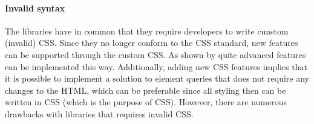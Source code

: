 \documentclass[a4paper,11pt]{kth-mag}
\begin{document}
    
    \paragraph{Invalid syntax}
    The libraries \cite{eq_imp_magichtml,eq_imp_eqcss,eq_imp_prollyfill-min-width,eq_imp_localised-css,eq_imp_gss} have in common that they require developers to write cunstom (invalid) \gls{CSS}.
    Since they no longer conform to the \gls{CSS} standard, new features can be supported through the custom \gls{CSS}.
    As shown by \cite{eq_imp_eqcss,eq_imp_gss} quite advanced features can be implemented this way.
    Additionally, adding new \gls{CSS} features implies that it is possible to implement a solution to element queries that does not require any changes to the \gls{HTML}, which can be preferable since all styling then can be written in \gls{CSS} (which is the purpose of \gls{CSS}).
    However, there are numerous drawbacks with libraries that requires invalid \gls{CSS}.
    
\end{document}
